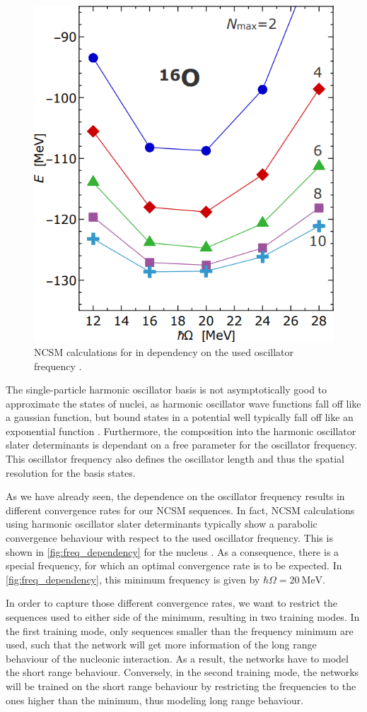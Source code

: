 \begin{figure}
  \includegraphics[width=.5\textwidth]{media/freq_filter.png}
  \caption{NCSM calculations for  in dependency on the used oscillator frequency \cite{sommerschule}.}
  \label{fig:freq_dependency}
\end{figure}
The single-particle harmonic oscillator basis is not asymptotically good to approximate the states of nuclei, as harmonic oscillator wave functions fall off like a gaussian function, but bound states in a potential well typically fall off like an exponential function \cite{sommerschule}. Furthermore, the composition into the harmonic oscillator slater determinants is dependant on a free parameter for the oscillator frequency. This oscillator frequency also defines the oscillator length and thus the spatial resolution for the basis states.

As we have already seen, the dependence on the oscillator frequency results in different convergence rates for our NCSM sequences. In fact, NCSM calculations using harmonic oscillator slater determinants typically show a parabolic convergence behaviour with respect to the used oscillator frequency. This is shown in \autoref{fig:freq_dependency} for the nucleus . As a consequence, there is a special frequency, for which an optimal convergence rate is to be expected. In \autoref{fig:freq_dependency}, this minimum frequency is given by $\hbar \Omega = \SI{20}{\mega\electronvolt}$.

In order to capture those different convergence rates, we want to restrict the sequences used to either side of the minimum, resulting in two training modes. In the first training mode, only sequences smaller than the frequency minimum are used, such that the network will get more information of the long range behaviour of the nucleonic interaction. As a result, the networks have to model the short range behaviour. Conversely, in the second training mode, the networks will be trained on the short range behaviour by restricting the frequencies to the ones higher than the minimum, thus modeling long range behaviour.

